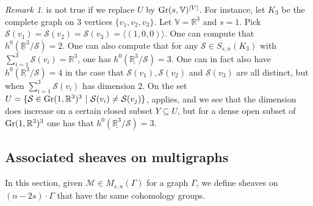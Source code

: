 \documentclass{article}
\theoremstyle{definition}
\theoremstyle{remark}
\newtheorem{remark}[theorem]{Remark}
\begin{document}
\begin{remark}
      is not true if we replace $U$ by $\textup{Gr}(s, \mathbb{V})^{|V|}$. For instance, let $K_3$ be the complete graph on $3$ vertices $\{v_1,v_2,v_3\}$. Let $\mathbb{V}=\mathbb{R}^{3}$ and $s=1$. Pick $\mathcal{S}(v_1) =\mathcal{S}(v_2)  =\mathcal{S}(v_3) = \langle (1,0,0) \rangle$. One can compute that $h^{0}(\underline{\mathbb{R}}^{3}/ \mathcal{S}) = 2$. One can also compute that for any $\mathcal{S}\in S_{s,n}(K_3)$ with $\sum_{i=1}^{3} \mathcal{S}(v_i) = \mathbb{R}^{3}$, one has $h^{0}(\underline{\mathbb{R}^{3}}/ \mathcal{S}) = 3$. One can in fact also have $h^{0}(\underline{\mathbb{R}^{3}} / \mathcal{S}) = 4$ in the case that $\mathcal{S}(v_1), \mathcal{S}(v_2)$ and $\mathcal{S}(v_3)$ are all distinct, but when $\sum_{i=1}^{3} \mathcal{S}(v_i)$ has dimension $2$. On the set $U=\{ \mathcal{S} \in \textup{Gr}(1, \mathbb{R}^{3})^{3}~\vert ~\mathcal{S}(v_i)\neq \mathcal{S}(v_j) \}$,  applies, and we see that the dimension does increase on a certain closed subset $Y\subseteq 
    U$, but for a dense open subset of $\textup{Gr}(1, \mathbb{R}^{3})^{3}$ one has that $h^{0}(\underline{\mathbb{R}^{3}}/\mathcal{S}) =3$.
\end{remark}


\subsection{Associated sheaves on 
multigraphs}\label{assoc_sheaves}
In this section, given $\mathcal{M} \in M_{s,n}(\Gamma)$ for a graph $\Gamma$, we define sheaves on $(n-2s)\cdot \Gamma$ that have the same cohomology groups.
\end{document}
